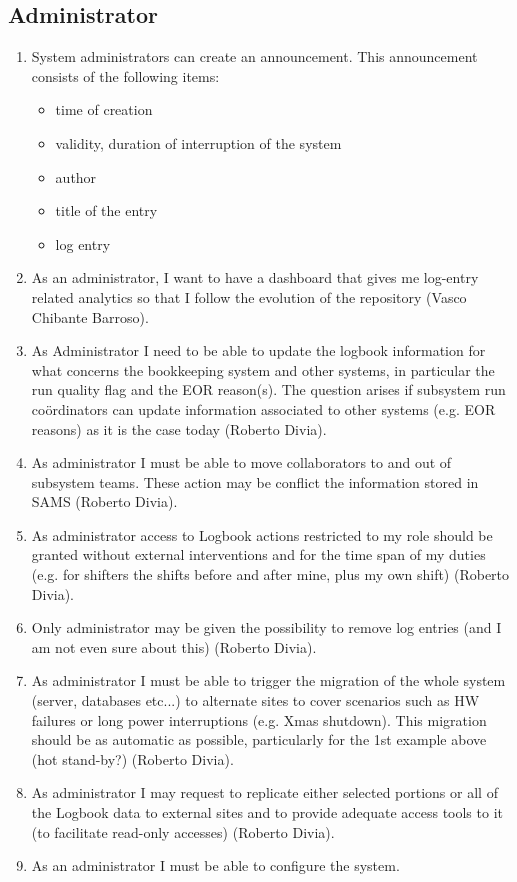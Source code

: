 \subsection{Administrator}
\begin{enumerate}
  \item System administrators can create an announcement. This announcement consists of the following items:
  \begin{itemize}
    \item time of creation
    \item validity, duration of interruption of the system
    \item author
    \item title of the entry
    \item log entry
  \end{itemize}
  \item As an administrator, I want to have a dashboard that gives me log-entry related analytics so that I follow the evolution of the repository (Vasco Chibante Barroso). 
  \item As Administrator I need to be able to update the logbook information for what concerns the bookkeeping system and other systems, in particular the run quality flag and the EOR reason(s). The question arises if subsystem run co\"ordinators can update information associated to other systems (e.g. EOR reasons) as it is the case today (Roberto Divia).
  \item As administrator I must be able to move collaborators to and out of subsystem teams. These action may be conflict the information stored in SAMS (Roberto Divia).
    \item As administrator access to Logbook actions restricted to my role should be granted without external interventions and for the time span of my duties (e.g. for shifters the shifts before and after mine, plus my own shift) (Roberto Divia).
  \item Only administrator may be given the possibility to remove log entries (and I am not even sure about this) (Roberto Divia).
\item As administrator I must be able to trigger the migration of the whole system (server, databases etc...) to alternate sites to cover scenarios such as HW failures or long power interruptions (e.g. Xmas shutdown). This migration should be as automatic as possible, particularly for the 1st example above (hot stand-by?) (Roberto Divia).
  \item As administrator I may request to replicate either selected portions or all of the Logbook data to external sites and to provide adequate access tools to it (to facilitate read-only accesses) (Roberto Divia).
  \item As an administrator I must be able to configure the system.
\end{enumerate}

